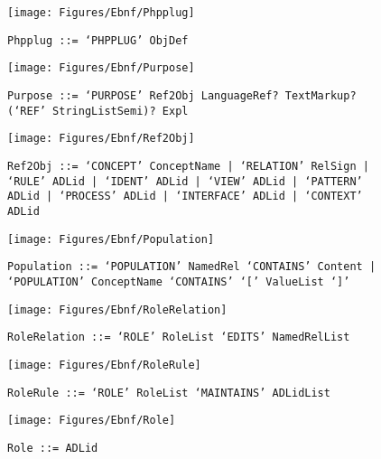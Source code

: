  \begin{figure}[H]
  \centering
  \texttt{[image: Figures/Ebnf/Phpplug]}
  \caption*{\texttt{Phpplug \small::=  `PHPPLUG' ObjDef}}
  \label{fig:ebnf-Phpplug}
 \end{figure}

 \begin{figure}[H]
  \centering
  \texttt{[image: Figures/Ebnf/Purpose]}
  \caption*{\texttt{Purpose \small::=  `PURPOSE' Ref2Obj LanguageRef? TextMarkup? (`REF' StringListSemi)? Expl}}
  \label{fig:ebnf-Purpose}
 \end{figure}

 \begin{figure}[H]
  \centering
  \texttt{[image: Figures/Ebnf/Ref2Obj]}
  \caption*{\texttt{Ref2Obj \small::=  `CONCEPT' ConceptName | `RELATION' RelSign | `RULE' ADLid | `IDENT' ADLid | `VIEW' ADLid | `PATTERN' ADLid | `PROCESS' ADLid | `INTERFACE' ADLid | `CONTEXT' ADLid}}
  \label{fig:ebnf-Ref2Obj}
 \end{figure}

 \begin{figure}[H]
  \centering
  \texttt{[image: Figures/Ebnf/Population]}
  \caption*{\texttt{Population \small::=  `POPULATION' NamedRel `CONTAINS' Content | `POPULATION' ConceptName `CONTAINS' `[' ValueList `]'}}
  \label{fig:ebnf-Population}
 \end{figure}

 \begin{figure}[H]
  \centering
  \texttt{[image: Figures/Ebnf/RoleRelation]}
  \caption*{\texttt{RoleRelation \small::=  `ROLE' RoleList `EDITS' NamedRelList}}
  \label{fig:ebnf-RoleRelation}
 \end{figure}

 \begin{figure}[H]
  \centering
  \texttt{[image: Figures/Ebnf/RoleRule]}
  \caption*{\texttt{RoleRule \small::=  `ROLE' RoleList `MAINTAINS' ADLidList}}
  \label{fig:ebnf-RoleRule}
 \end{figure}

 \begin{figure}[H]
  \centering
  \texttt{[image: Figures/Ebnf/Role]}
  \caption*{\texttt{Role \small::=  ADLid}}
  \label{fig:ebnf-Role}
 \end{figure}

